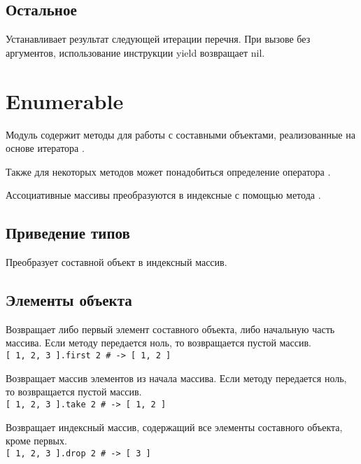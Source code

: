 \subsection*{Остальное}

\begin{methodlist}
  Устанавливает результат следующей итерации перечня. При вызове без аргументов, использование инструкции yield возвращает nil.
\end{methodlist}

\section{Enumerable} 

Модуль содержит методы для работы с составными объектами, реализованные на основе итератора . 

Также для некоторых методов может понадобиться определение оператора \method{<=>}. 

Ассоциативные массивы преобразуются в индексные с помощью метода . 

\subsection*{Приведение типов} 

\begin{methodlist}
  Преобразует составной объект в индексный массив.
\end{methodlist}

\subsection*{Элементы объекта}

\begin{methodlist}
  Возвращает либо первый элемент составного объекта, либо начальную часть массива. Если методу передается ноль, то возвращается пустой массив. 
  \\\verb![ 1, 2, 3 ].first 2 # -> [ 1, 2 ]!
 
  Возвращает массив элементов из начала массива. Если методу передается ноль, то возвращается пустой массив. 
  \\\verb![ 1, 2, 3 ].take 2 # -> [ 1, 2 ]!
 
  Возвращает индексный массив, содержащий все элементы составного объекта, кроме первых. 
  \\\verb![ 1, 2, 3 ].drop 2 # -> [ 3 ]!
\end{methodlist}

